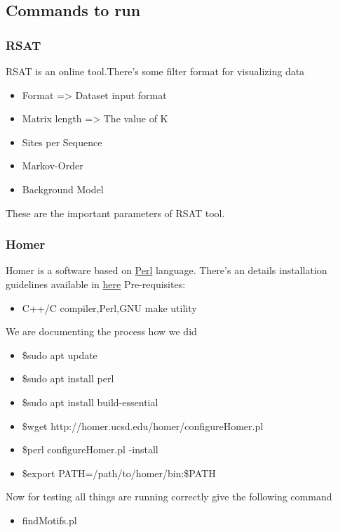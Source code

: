 \documentclass[11pt]{article}
\begin{document}
    \subsection{Commands to run}
        \subsubsection{RSAT}
        RSAT is an online tool.There's some filter format for visualizing data
        \begin{itemize}
            \item Format => Dataset input format
            \item Matrix length => The value of K 
            \item Sites per Sequence
            \item Markov-Order
            \item Background Model
        \end{itemize}
        These are the important parameters of RSAT tool.
        \subsubsection{Homer}
        Homer is a software based on \href{https://www.perl.org/}{Perl} language.
        There's an details installation guidelines available in \href{http://homer.ucsd.edu/homer/}{here}
        Pre-requisites:
        \begin{itemize}
            \item C++/C compiler,Perl,GNU make utility
        \end{itemize}
        We are documenting the process how we did 
        \begin{itemize}
            \item \$sudo apt update
            \item \$sudo apt install perl
            \item \$sudo apt install build-essential
            \item \$wget http://homer.ucsd.edu/homer/configureHomer.pl
            \item \$perl configureHomer.pl -install
            \item \$export PATH=/path/to/homer/bin:\$PATH
        \end{itemize}
        Now for testing all things are running correctly
        give the following command
        \begin{itemize}
            \item findMotifs.pl
        \end{itemize}
    \newpage
\end{document}
